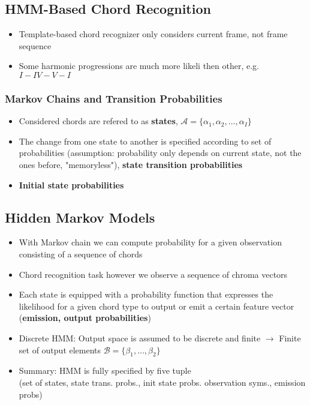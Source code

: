 \documentclass{scrartcl}
\begin{document}
\subsection{HMM-Based Chord Recognition}
\begin{itemize}
    \item
        Template-based chord recognizer only considers current frame, not frame sequence
    \item
        Some harmonic progressions are much more likeli then other, e.g. $I-IV-V-I$
\end{itemize}
\subsubsection*{Markov Chains and Transition Probabilities}
\begin{itemize}
    \item
        Considered chords are refered to as \textbf{states}, $\mathcal{A} = \{\alpha_1, \alpha_2, \dots, \alpha_I\}$
    \item
        The change from one state to another is specified according to set of probabilities (assumption: probability only depends on current state, not the ones before, "memoryless"), \textbf{state transition probabilities}
    \item 
        \textbf{Initial state probabilities}
\end{itemize}
\subsection*{Hidden Markov Models}
\begin{itemize}
    \item
        With Markov chain we can compute probability for a given observation consisting of a sequence of chords
    \item
        Chord recognition task however we observe a sequence of chroma vectors
    \item
        Each state is equipped with a probability function that expresses the likelihood for a given chord type to output or emit a certain feature vector (\textbf{emission, output probabilities})
    \item
        Discrete HMM: Output space is assumed to be discrete and finite $\rightarrow$ Finite set of output elements $\mathcal{B} = \{\beta_1, \dots, \beta_2\}$
    \item
        Summary: HMM is fully specified by five tuple\\ (set of states, state trans. probs., init state probs. observation syms., emission probs)
\end{itemize}
\end{document}
